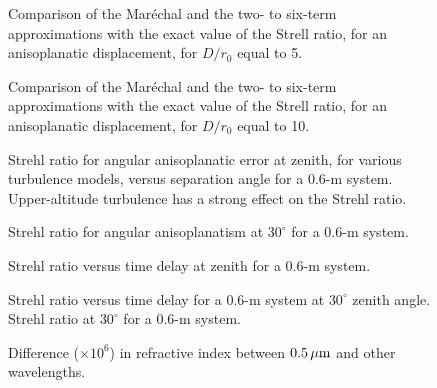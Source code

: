 \begin{figure}
\caption{ Comparison of the Mar\'{e}chal and the two- to six-term
approximations  with the exact value of the Strell ratio, for an
anisoplanatic displacement, for $D/r_0$  equal to 5. } \label{f5}
\end{figure}
\begin{figure}
\caption{ Comparison of the Mar\'{e}chal and the two- to six-term
approximations  with the exact value of the Strell ratio, for an
anisoplanatic displacement, for $D/r_0$  equal to 10. } \label{f10}
\end{figure}
\begin{figure}
\caption{Strehl ratio for angular anisoplanatic error at zenith,
for  various turbulence models, versus separation angle for a 0.6-m
system.   Upper-altitude turbulence has a strong effect on the
Strehl ratio.}
\label{faaz}
\end{figure}
\begin{figure}
\caption{ Strehl ratio for angular anisoplanatism at $30^{\circ}$
for a 0.6-m system.}
\label{faa30}
\end{figure}
\begin{figure}
\caption{ Strehl ratio versus time delay at zenith for a 0.6-m
system.}
\label{ftdz}
\end{figure}
\begin{figure}
\caption{ Strehl ratio versus time delay for a 0.6-m system at
$30^{\circ}$ zenith angle.     Strehl ratio  at $30^{\circ}$ for a
0.6-m system. }
\label{ftd30}
\end{figure}
\begin{figure}
\caption{ Difference ($\times 10^6$) in refractive index between
$0.5 \, \mu \rm m$ and other wavelengths.}\label{fri}
\end{figure}

